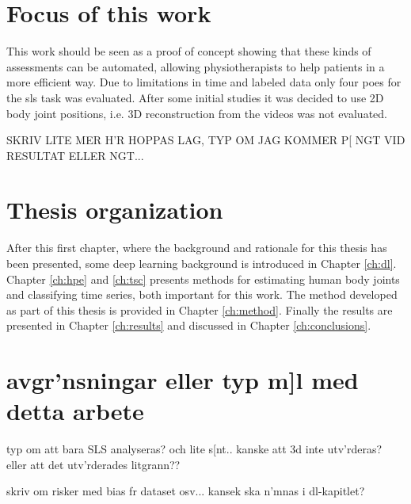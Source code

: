 \section{Focus of this work}
This work should be seen as a proof of concept showing that these kinds of assessments can be automated, allowing physiotherapists to help patients in a more efficient way. Due to limitations in time and labeled data only four \glspl{poe} for the \gls{sls} task was evaluated. After some initial studies it was decided to use 2D body joint positions, i.e. 3D reconstruction from the videos was not evaluated.

SKRIV LITE MER H'R HOPPAS LAG, TYP OM JAG KOMMER P[ NGT VID RESULTAT ELLER NGT...

\section{Thesis organization}
After this first chapter, where the background and rationale for this thesis has been presented, some deep learning background is introduced in Chapter \ref{ch:dl}. Chapter \ref{ch:hpe} and \ref{ch:tsc} presents methods for estimating human body joints and classifying time series, both important for this work. The method developed as part of this thesis is provided in Chapter \ref{ch:method}. Finally the results are presented in Chapter \ref{ch:results} and discussed in Chapter \ref{ch:conclusions}.


\section{avgr'nsningar eller typ m]l med detta arbete}
typ om att bara SLS analyseras? och lite s[nt.. kanske att 3d inte utv'rderas? eller att det utv'rderades litgrann??


skriv om risker med bias fr dataset osv... kansek ska n'mnas i dl-kapitlet?
